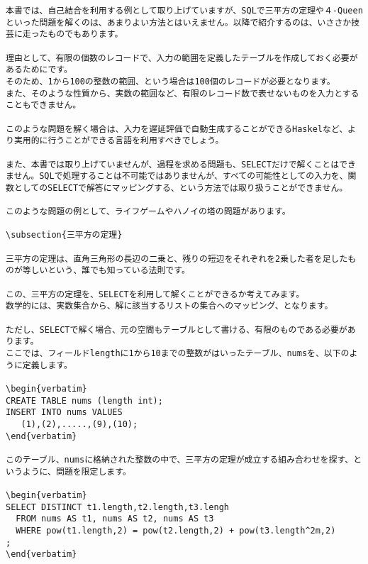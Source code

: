 \begin{lstlisting}[caption=自己結合の外部結合の例,label=sql:outer]
本書では、自己結合を利用する例として取り上げていますが、SQLで三平方の定理や４-Queenといった問題を解くのは、あまりよい方法とはいえません。以降で紹介するのは、いささか技芸に走ったものでもあります。

理由として、有限の個数のレコードで、入力の範囲を定義したテーブルを作成しておく必要があるためにです。
そのため、1から100の整数の範囲、という場合は100個のレコードが必要となります。
また、そのような性質から、実数の範囲など、有限のレコード数で表せないものを入力とすることもできません。

このような問題を解く場合は、入力を遅延評価で自動生成することができるHaskelなど、より実用的に行うことができる言語を利用すべきでしょう。

また、本書では取り上げていませんが、過程を求める問題も、SELECTだけで解くことはできません。SQLで処理することは不可能ではありませんが、すべての可能性としての入力を、関数としてのSELECTで解答にマッピングする、という方法では取り扱うことができません。

このような問題の例として、ライフゲームやハノイの塔の問題があります。

\subsection{三平方の定理}

三平方の定理は、直角三角形の長辺の二乗と、残りの短辺をそれぞれを2乗した者を足したものが等しいという、誰でも知っている法則です。

この、三平方の定理を、SELECTを利用して解くことができるか考えてみます。
数学的には、実数集合から、解に該当するリストの集合へのマッピング、となります。

ただし、SELECTで解く場合、元の空間もテーブルとして書ける、有限のものである必要があります。
ここでは、フィールドlengthに1から10までの整数がはいったテーブル、numsを、以下のように定義します。

\begin{verbatim}
CREATE TABLE nums (length int);
INSERT INTO nums VALUES
   (1),(2),.....,(9),(10);
\end{verbatim}

このテーブル、numsに格納された整数の中で、三平方の定理が成立する組み合わせを探す、というように、問題を限定します。

\begin{verbatim}
SELECT DISTINCT t1.length,t2.length,t3.lengh 
  FROM nums AS t1, nums AS t2, nums AS t3
  WHERE pow(t1.length,2) = pow(t2.length,2) + pow(t3.length^2m,2) 
;
\end{verbatim}


\end{lstlisting}
